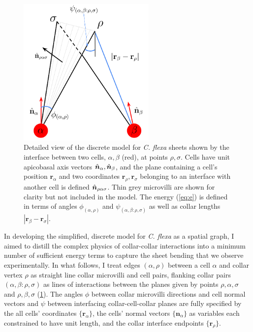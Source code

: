 \begin{figure}[tbhp]
	\centering
	\includegraphics[width=0.6\textwidth]{model.png}
	\caption[Discrete model details]{Detailed view of the discrete model for \textit{C. flexa} sheets shown by the interface between two cells, $\alpha, \beta$ (red), at points $\rho,\sigma$. Cells have unit apicobasal axis vectors $\hat{\bm{n}}_\alpha, \hat{\bm{n}}_\beta$, and the plane containing a cell's position $\bm{r}_\alpha$ and two coordinates $\bm{r}_\rho,\bm{r}_\sigma$ belonging to an interface with another cell is defined $\hat{\bm{n}}_{\rho\alpha\sigma}$. Thin grey microvilli are shown for clarity but not included in the model. The energy (\cref{eq:e}) is defined in terms of angles $\phi_{(\alpha,\rho)}$ and $\psi_{(\alpha,\beta:\rho,\sigma)}$ as well as collar lengths $|\bm{r}_\beta - \bm{r}_\sigma|$.}
	\label{fig:model_details}
\end{figure}

In developing the simplified, discrete model for \textit{C. flexa} as a spatial graph, I aimed to distill the complex physics of collar-collar interactions into a minimum number of sufficient energy terms to capture the sheet bending that we observe experimentally. 
In what follows, I treat edges $(\alpha, \rho)$ between a cell $\alpha$ and collar vertex $\rho$ as straight line collar microvilli and cell pairs, flanking collar pairs $(\alpha, \beta: \rho, \sigma)$ as lines of interactions between the planes given by points $\rho, \alpha, \sigma$ and $\rho, \beta, \sigma$ (\cref{fig:model_details}).
The angles $\phi$ between collar microvilli directions and cell normal vectors and $\psi$ between interfacing collar-cell-collar planes are fully specified by the all cells' coordinates $\{\bm{r}_\alpha\}$, the cells' normal vectors $\{\bm{n}_\alpha\}$ as variables each constrained to have unit length, and the collar interface endpoints $\{\bm{r}_\rho\}$.

